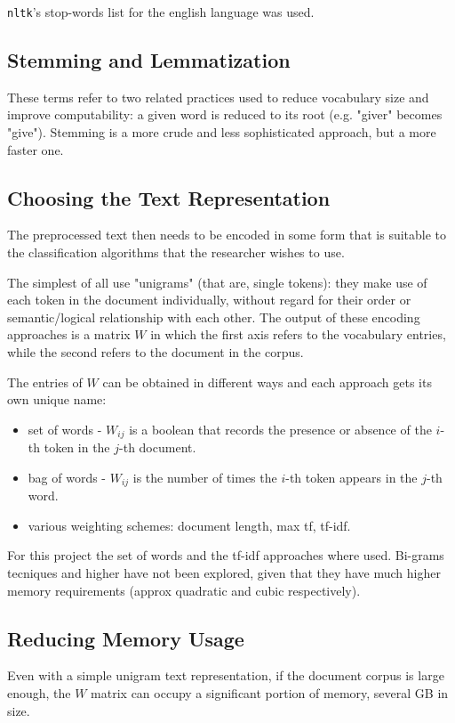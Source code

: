 \texttt{nltk}'s stop-words list for the english language was used.

\subsection{Stemming and Lemmatization}
These terms refer to two related practices used to reduce vocabulary size and improve computability: a given word is reduced to its root (e.g. "giver" becomes "give").
Stemming is a more crude and less sophisticated approach, but a more faster one.


\subsection{Choosing the Text Representation}
The preprocessed text then needs to be encoded in some form that is suitable to the classification algorithms that the researcher wishes to use.

The simplest of all use "unigrams" (that are, single tokens): they make use of each token in the document individually, without regard for their order or semantic/logical relationship with each other. The output of these encoding approaches is a matrix $W$ in which the first axis refers to the vocabulary entries, while the second refers to the document in the corpus.

The entries of $W$ can be obtained in different ways and each approach gets its own unique name:
\begin{itemize}
    \item set of words - $W_{ij}$ is a boolean that records the presence or absence of the $i$-th token in the $j$-th document.
    \item bag of words - $W_{ij}$ is the number of times the $i$-th token appears in the $j$-th word.
    \item various weighting schemes: document length, max tf, tf-idf.
\end{itemize}

For this project the set of words and the tf-idf approaches where used. Bi-grams tecniques and higher have not been explored, given that they have much higher memory requirements (approx quadratic and cubic respectively).

\subsection{Reducing Memory Usage}
Even with a simple unigram text representation, if the document corpus is large enough, the $W$ matrix can occupy a significant portion of memory, several GB in size.

